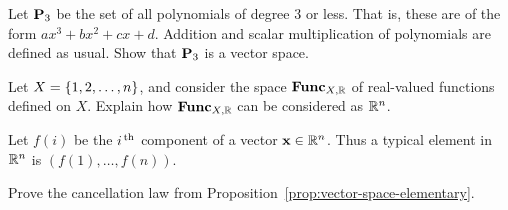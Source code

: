 \begin{ex}
  Let $\mathbf{P}_{3}$ be the set of all polynomials of degree 3 or
  less. That is, these are of the form $ax^3+bx^2+cx+d$. Addition and
  scalar multiplication of polynomials are defined as usual.  Show
  that $\mathbf{P}_{3}$ is a vector space.
\end{ex}

\begin{ex}
  Let $X=\left\{1,2,\ldots,n\right\}$, and consider the space $\mathbf{Func}_{X,\mathbb{R}}$ of
  real-valued functions defined on $X$. Explain how $\mathbf{Func}_{X,\mathbb{R}}$ can be
  considered as $\mathbb{R}^n$.
  \begin{sol}
    Let $f(i)$ be the $i^{\,\rm th}$ component of a vector
    $\vect{x}\in\R^n$. Thus a typical element in $\mathbb{R}^n$ is
    $ (f(1),\ldots,f(n))$.
  \end{sol}
\end{ex}

\begin{ex}
  Prove the cancellation law from
  Proposition~\ref{prop:vector-space-elementary}.
\end{ex}

